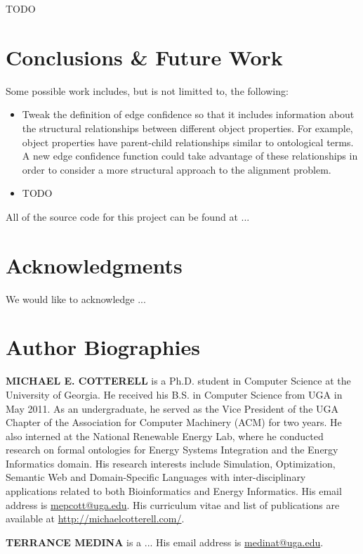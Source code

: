 \documentclass[letterpaper,twocolumn,12pt]{article}
\begin{document}
TODO

\section{Conclusions \& Future Work}
\label{sec:conclusions}


Some possible work includes, but is not limitted to, the following:

\begin{itemize}
\item Tweak the definition of edge confidence so that it includes information about the structural relationships between different object properties.
For example, object properties have parent-child relationships similar to ontological terms.
A new edge confidence function could take advantage of these relationships in order to consider a more structural approach to the alignment problem.
\item TODO
\end{itemize}

All of the source code for this project can be found at ...

\section*{Acknowledgments}

We would like to acknowledge ...

%

 

\section*{Author Biographies} 
\vspace{8 pt}
\noindent \textbf{MICHAEL E. COTTERELL} is a Ph.D. student in Computer Science at the University of Georgia. 
He received his B.S. in Computer Science from UGA in May 2011. 
As an undergraduate, he served as the Vice President of the UGA Chapter of the Association for Computer Machinery (ACM) for two years. 
He also interned at the National Renewable Energy Lab, where he conducted research on formal ontologies for Energy Systems Integration and the Energy Informatics domain. 
His research interests include Simulation, Optimization, Semantic Web and Domain-Specific Languages with inter-disciplinary applications related to both Bioinformatics and Energy Informatics.
His email address is \href{mailto:mepcott@uga.edu}{mepcott@uga.edu}.
His curriculum vitae and list of publications are available at \url{http://michaelcotterell.com/}.

\vspace{8 pt}
\noindent \textbf{TERRANCE MEDINA} is a ... His email address is \href{mailto:medinat@uga.edu}{medinat@uga.edu}.
\end{document}
